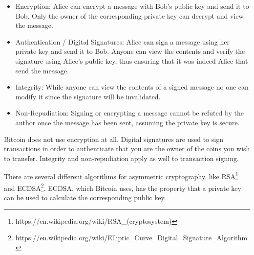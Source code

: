 \begin{itemize}
\item Encryption: Alice can encrypt a message with Bob’s public key and send it to Bob. Only the owner of the corresponding private key can decrypt and view the message.
\item Authentication / Digital Signatures: Alice can sign a message using her private key and send it to Bob. Anyone can view the contents and verify the signature using Alice’s public key, thus ensuring that it was indeed Alice that send the message.
\item Integrity: While anyone can view the contents of a signed message no one can modify it since the signature will be invalidated.
\item Non-Repudiation: Signing or encrypting a message cannot be refuted by the author once the message has been sent, assuming the private key is secure.
\end{itemize}


\begin{note}
Bitcoin does not use encryption at all. Digital signatures are used to sign transactions in order to authenticate that you are the owner of the coins you wish to transfer. Integrity and non-repudiation apply as well to transaction signing.
\end{note}

There are several different algorithms for asymmetric cryptography, like RSA\footnote{https://en.wikipedia.org/wiki/RSA\_(cryptosystem)} and ECDSA\footnote{https://en.wikipedia.org/wiki/Elliptic\_Curve\_Digital\_Signature\_Algorithm}. ECDSA, which Bitcoin uses, has the property that a private key can be used to calculate the corresponding public key.


